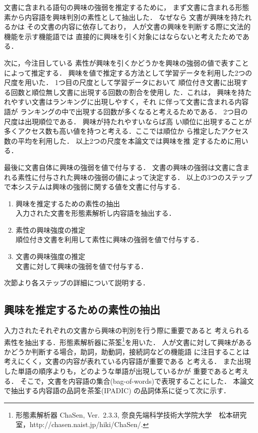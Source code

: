\documentclass[japanese]{jnlp_1.4}
\begin{document}
文書に含まれる語句の興味の強弱を推定するために，
まず文書に含まれる形態素から内容語を興味判別の素性として抽出した．
なぜなら
文書が興味を持たれるかは
その文書の内容に依存しており，
人が文書の興味を判断する際に文法的機能を示す機能語では
直接的に興味を引く対象にはならないと考えたためである．


次に，今注目している
素性が興味を引くかどうかを興味の強弱の値で表すことによって推定する．
興味を値で推定する方法として学習データを利用した2つの尺度を用いた．
1つ目の尺度として学習データにおいて
順位付き文書に出現する回数と順位無し文書に出現する回数の割合を使用し
た．これは，
興味を持たれやすい文書はランキングに出現しやすく，それ
に伴って文書に含まれる内容語が
ランキングの中で出現する回数が多くなると考えるためである．
2つ目の尺度は出現順位である．
興味が持たれやすいならば高
い順位に出現することが多くアクセス数も高い値を持つと考える．ここでは順位か
ら推定したアクセス数の平均を利用した．
以上2つの尺度を本論文では興味を推
定するために用いる．

最後に文書自体に興味の強弱を値で付与する．
文書の興味の強弱は文書に含まれる素性に付与された興味の強弱の値によって決定する．
以上の3つのステップで本システムは興味の強弱に関する値を文書に付与する．
\begin{enumerate}
 \item 興味を推定するための素性の抽出\\
	入力された文書を形態素解析し内容語を抽出する．
 \item 素性の興味強度の推定\\
       順位付き文書を利用して素性に興味の強弱を値で付与する．
 \item 文書の興味強度の推定\\
       文書に対して興味の強弱を値で付与する．
\end{enumerate}

次節より各ステップの詳細について説明する．


\subsection{興味を推定するための素性の抽出}\label{nai}

入力されたそれぞれの文書から興味の判別を行う際に重要であると
考えられる素性を抽出する．形態素解析器に茶筌\footnote{
形態素解析器 ChaSen, Ver.~2.3.3, 奈良先端科学技術大学院大学　松本研究室，http://chasen.naist.jp/hiki/ChaSen/.
}を用いた．
人が文書に対して興味があるかどうか判断する場合，助詞，助動詞，接続詞などの機能語
に注目することは考えにくく，文書の内容が表れている内容語が重要である
と考える．
また出現した単語の順序よりも，どのような単語が出現しているかが
重要であると考える．
そこで，文書を内容語の集合(bag-of-words)で表現することにした．
本論文で抽出する内容語の品詞を茶筌(IPADIC)
の品詞体系に従って次に示す．
\end{document}
